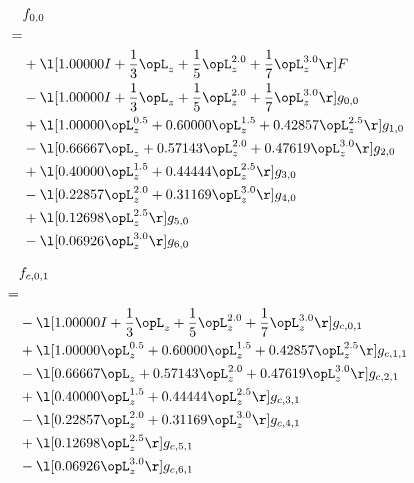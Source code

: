 \begin{alignat}{2} 
\label{eq:f_00_0} 
& f_{0,0} \nonumber \\ 
 = \\ 
& + \l[  1.00000 I + \frac{1}{3} \opL_z + \frac{1}{5} \opL_z^{2.0} + \frac{1}{7} \opL_z^{3.0}  \r] F \nonumber \\ 
& - \l[  1.00000 I + \frac{1}{3} \opL_z + \frac{1}{5} \opL_z^{2.0} + \frac{1}{7} \opL_z^{3.0}  \r] g_{0,0} \nonumber \\ 
& + \l[  1.00000 \opL_z^{0.5} +  0.60000 \opL_z^{1.5} +  0.42857 \opL_z^{2.5}  \r] g_{1,0} \nonumber \\ 
& - \l[  0.66667 \opL_z +  0.57143 \opL_z^{2.0} +  0.47619 \opL_z^{3.0}  \r] g_{2,0} \nonumber \\ 
& + \l[  0.40000 \opL_z^{1.5} +  0.44444 \opL_z^{2.5}  \r] g_{3,0} \nonumber \\ 
& - \l[  0.22857 \opL_z^{2.0} +  0.31169 \opL_z^{3.0}  \r] g_{4,0} \nonumber \\ 
& + \l[  0.12698 \opL_z^{2.5}  \r] g_{5,0} \nonumber \\ 
& - \l[  0.06926 \opL_z^{3.0}  \r] g_{6,0} \nonumber \\ 
\end{alignat} 


\begin{alignat}{2} 
\label{eq:f_01_0} 
& f_{c,0,1} \nonumber \\ 
 = \\ 
& - \l[  1.00000 I + \frac{1}{3} \opL_z + \frac{1}{5} \opL_z^{2.0} + \frac{1}{7} \opL_z^{3.0}  \r] g_{c,0,1} \nonumber \\ 
& + \l[  1.00000 \opL_z^{0.5} +  0.60000 \opL_z^{1.5} +  0.42857 \opL_z^{2.5}  \r] g_{c,1,1} \nonumber \\ 
& - \l[  0.66667 \opL_z +  0.57143 \opL_z^{2.0} +  0.47619 \opL_z^{3.0}  \r] g_{c,2,1} \nonumber \\ 
& + \l[  0.40000 \opL_z^{1.5} +  0.44444 \opL_z^{2.5}  \r] g_{c,3,1} \nonumber \\ 
& - \l[  0.22857 \opL_z^{2.0} +  0.31169 \opL_z^{3.0}  \r] g_{c,4,1} \nonumber \\ 
& + \l[  0.12698 \opL_z^{2.5}  \r] g_{c,5,1} \nonumber \\ 
& - \l[  0.06926 \opL_z^{3.0}  \r] g_{c,6,1} \nonumber \\ 
\end{alignat} 


